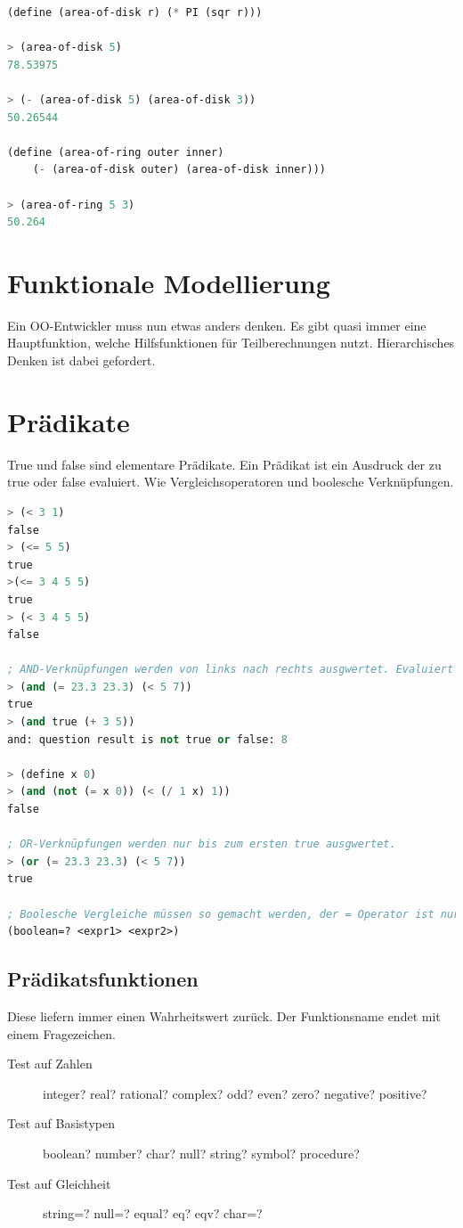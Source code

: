 \begin{lstlisting}[language=Lisp, caption=Beispiel Funktionen]
(define (area-of-disk r) (* PI (sqr r)))

> (area-of-disk 5)
78.53975

> (- (area-of-disk 5) (area-of-disk 3))
50.26544

(define (area-of-ring outer inner)
	(- (area-of-disk outer) (area-of-disk inner)))

> (area-of-ring 5 3)
50.264
\end{lstlisting}

\section{Funktionale Modellierung}
Ein OO-Entwickler muss nun etwas anders denken. Es gibt quasi immer eine Hauptfunktion, welche Hilfsfunktionen für Teilberechnungen nutzt. Hierarchisches Denken ist dabei gefordert.

\section{Prädikate}
True und false sind elementare Prädikate. Ein Prädikat ist ein Ausdruck der zu true oder false evaluiert. Wie Vergleichsoperatoren und boolesche Verknüpfungen.
\begin{lstlisting}[language=Lisp, caption=Prädikate]
> (< 3 1)
false
> (<= 5 5)
true
>(<= 3 4 5 5)
true
> (< 3 4 5 5)
false

; AND-Verknüpfungen werden von links nach rechts ausgwertet. Evaluiert ein Ausdruck links zu false, dann wird die Auswertung beendet. Falls ein Ausdruck keinen boolschen Wert zurückgibt, kommt es zum Laufzeitfehler.
> (and (= 23.3 23.3) (< 5 7))
true
> (and true (+ 3 5))
and: question result is not true or false: 8

> (define x 0)
> (and (not (= x 0)) (< (/ 1 x) 1))
false

; OR-Verknüpfungen werden nur bis zum ersten true ausgwertet.
> (or (= 23.3 23.3) (< 5 7))
true

; Boolesche Vergleiche müssen so gemacht werden, der = Operator ist nur für Zahlen
(boolean=? <expr1> <expr2>)
\end{lstlisting}

\subsection{Prädikatsfunktionen}
Diese liefern immer einen Wahrheitswert zurück. Der Funktionsname endet mit einem Fragezeichen.
\begin{description}
	\item[Test auf Zahlen] integer? real? rational? complex? odd? even? zero? negative? positive?
	\item[Test auf Basistypen] boolean? number? char? null? string? symbol? procedure?
	\item[Test auf Gleichheit] string=? null=? equal? eq? eqv? char=?
\end{description}

